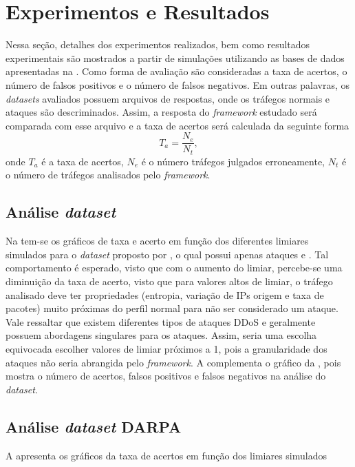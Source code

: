 \chapter[Resultados]{Experimentos e Resultados}
\label{resultados}
Nessa seção, detalhes dos experimentos realizados, bem como resultados experimentais são mostrados a partir de simulações utilizando as bases de dados apresentadas na . Como forma de avaliação são consideradas a  taxa de acertos, o número de falsos positivos e o número de falsos negativos. Em outras palavras, os \textit{datasets} avaliados possuem arquivos de respostas, onde os tráfegos normais e ataques são descriminados. Assim, a resposta do \textit{framework} estudado será comparada com esse arquivo e a taxa de acertos será calculada da seguinte forma
\begin{equation}
	T_a = \frac{N_e}{N_t},
\end{equation}
onde $T_a$ é a taxa de acertos, $N_e$ é o número tráfegos julgados erroneamente, $N_t$ é o número de tráfegos analisados pelo \textit{framework}. 

\section{Análise \textit{dataset}\cite{DataMining}}  
Na  tem-se os gráficos de taxa e acerto em função dos diferentes limiares simulados para o \textit{dataset} proposto por \cite{DataMining}, o qual possui apenas ataques e   . Tal comportamento é esperado, visto que com o aumento do limiar, percebe-se uma diminuição da taxa de acerto, visto que para valores altos de limiar, o tráfego analisado deve ter propriedades (entropia, variação de IPs origem e taxa de pacotes) muito próximas do perfil normal para não ser considerado um ataque. Vale ressaltar que existem diferentes tipos de ataques DDoS e geralmente possuem abordagens singulares para os ataques. Assim, seria uma escolha equivocada escolher valores de limiar próximos a 1, pois a granularidade dos ataques não seria abrangida pelo \textit{framework}. A  complementa o gráfico da , pois mostra o número de acertos, falsos positivos e falsos negativos na análise do \textit{dataset}.

\section{Análise \textit{dataset} DARPA}
A  apresenta os gráficos da taxa de acertos em função dos limiares simulados 



   